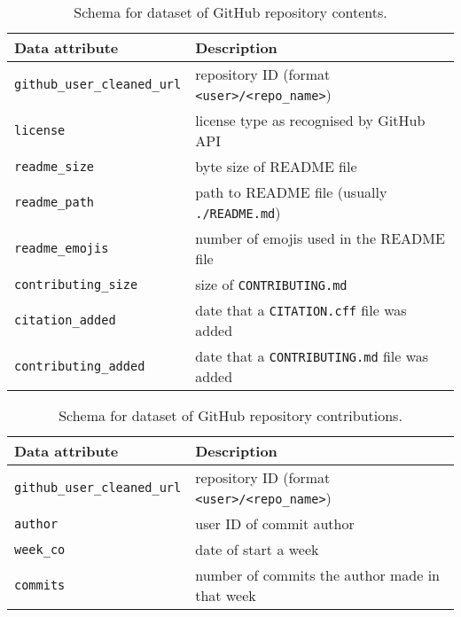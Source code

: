 \documentclass[10pt,a4paper]{scrartcl}
\begin{document}
\begin{table}
    \centering
    \begin{tabular}{l|l}
        \hline
        Data attribute & Description \\
        \hline
        \verb|github_user_cleaned_url| & repository ID (format \verb|<user>/<repo_name>|) \\
        \verb|license| & license type as recognised by GitHub API \\
        \verb|readme_size| & byte size of README file \\
        \verb|readme_path| & path to README file (usually \verb|./README.md|) \\
        \verb|readme_emojis| & number of emojis used in the README file \\
        \verb|contributing_size| & size of \verb|CONTRIBUTING.md| \\
        \verb|citation_added| & date that a \verb|CITATION.cff| file was added \\
        \verb|contributing_added| & date that a \verb|CONTRIBUTING.md| file was added \\
        \hline
    \end{tabular}
    \caption{Schema for dataset of GitHub repository contents.}
    \label{table:contents}
\end{table}

\begin{table}
    \centering
    \begin{tabular}{l|l}
        \hline
        Data attribute & Description \\
        \hline
        \verb|github_user_cleaned_url| & repository ID (format \verb|<user>/<repo_name>|) \\
        \verb|author| & user ID of commit author \\
        \verb|week_co| & date of start a week \\
        \verb|commits| & number of commits the author made in that week \\
        \hline
    \end{tabular}
    \caption{Schema for dataset of GitHub repository contributions.}
    \label{table:contributions}
\end{table}
\end{document}

